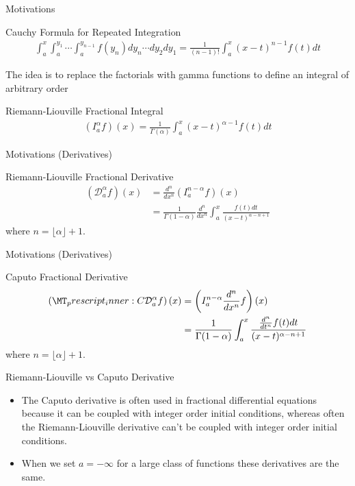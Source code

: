 \documentclass[pdf]{beamer}
\newcommand{\rld}[3]{ \left( \mathcal{D}_{#1}^{#2} #3 \right) }
\newcommand{\rli}[3]{ \left( I_{#1}^{#2} #3 \right) }
\newcommand{\capder}[3]{ \left( \prescript{C}{}{\mathcal{D}_{#1}^{#2}} #3 \right) }
\begin{document}
\begin{frame}{Motivations}
	\begin{block}{Cauchy Formula for Repeated Integration}
		\begin{align*}
			\int_{a}^{x} \int_{a}^{y_1} \cdots \int_a^{y_{n-1}} f(y_n) dy_n \cdots dy_2 dy_1 = \frac{1}{(n-1)!} \int_a^x(x-t)^{n-1}f(t)dt
		\end{align*}
	\end{block}
	\pause
	The idea is to replace the factorials with gamma functions to define an integral of arbitrary order
	\pause
	\begin{block}{Riemann-Liouville Fractional Integral}
		\begin{align*}
			\rli{a}{\alpha}{f}(x) = \frac{1}{\Gamma(\alpha)} \int_a^x(x-t)^{\alpha-1}f(t)dt
		\end{align*}
	\end{block}
\end{frame}

\begin{frame}{Motivations (Derivatives)}
	\begin{block}{Riemann-Liouville Fractional Derivative}
		\begin{align*}
			\rld{a}{\alpha}{f}(x) &= \frac{d^{n}}{dx^{n}} \rli{a}{n - \alpha}{f}(x) \\
				&= \frac{1}{\Gamma(1 - \alpha)}\frac{d^{n}}{dx^n} \int_a^x \frac{f(t)dt}{(x-t)^{\alpha - n + 1}}
		\end{align*}
		where $ n = \lfloor \alpha \rfloor + 1 $.
	\end{block}
\end{frame}

\begin{frame}{Motivations (Derivatives)}
	\begin{block}{Caputo Fractional Derivative}
		\begin{align*}
			\capder{a}{\alpha}{f}(x) &= \rli{a}{n - \alpha}{\frac{d^{n}}{dx^{n}}f}(x) \\
				&= \frac{1}{\Gamma(1 - \alpha)} \int_a^x \frac{\frac{d^{n}}{dt^n}f(t)dt}{(x-t)^{\alpha - n + 1}}
		\end{align*}
		where $ n = \lfloor \alpha \rfloor + 1 $.
	\end{block}
\end{frame}
\begin{frame}{ Riemann-Liouville vs Caputo Derivative}
    \begin{itemize}
	\item The Caputo derivative is often used in fractional differential equations because it
	can be coupled with integer order initial conditions, whereas often the Riemann-Liouville
	derivative can't be coupled with integer order initial conditions.
   
    \item When we set $ a = -\infty $ for a large class of functions these derivatives are the same.
    \end{itemize}
\end{frame}
\end{document}
